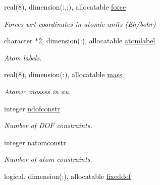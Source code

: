 \begin{DoxyCompactItemize}
real(8), dimension(\+:,\+:), allocatable \mbox{\hyperlink{structchemstr_1_1cxs_a05728bee6f7eb6e96b055e20ed6e6269}{force}}
\begin{DoxyCompactList}\small\item\em Forces wrt coordinates in atomic units (Eh/bohr) \end{DoxyCompactList}\item 
\mbox{\label{structchemstr_1_1cxs_a095011444234c28cf8331d986766af91}} 
character $\ast$2, dimension(\+:), allocatable \mbox{\hyperlink{structchemstr_1_1cxs_a095011444234c28cf8331d986766af91}{atomlabel}}
\begin{DoxyCompactList}\small\item\em Atom labels. \end{DoxyCompactList}\item 
\mbox{\label{structchemstr_1_1cxs_aa039bad319d194ec552f20d907b39127}} 
real(8), dimension(\+:), allocatable \mbox{\hyperlink{structchemstr_1_1cxs_aa039bad319d194ec552f20d907b39127}{mass}}
\begin{DoxyCompactList}\small\item\em Atomic masses in au. \end{DoxyCompactList}\item 
\mbox{\label{structchemstr_1_1cxs_a9f17c74f4ba3a0c7e92773b971c64852}} 
integer \mbox{\hyperlink{structchemstr_1_1cxs_a9f17c74f4ba3a0c7e92773b971c64852}{ndofconstr}}
\begin{DoxyCompactList}\small\item\em Number of D\+OF constraints. \end{DoxyCompactList}\item 
\mbox{\label{structchemstr_1_1cxs_a69b9cc3edf936c7544e131baa3a7f0f4}} 
integer \mbox{\hyperlink{structchemstr_1_1cxs_a69b9cc3edf936c7544e131baa3a7f0f4}{natomconstr}}
\begin{DoxyCompactList}\small\item\em Number of atom constraints. \end{DoxyCompactList}\item 
\mbox{\label{structchemstr_1_1cxs_abcda91614d230698c1e3c3707b2771a7}} 
logical, dimension(\+:), allocatable \mbox{\hyperlink{structchemstr_1_1cxs_abcda91614d230698c1e3c3707b2771a7}{fixeddof}}

\end{DoxyCompactItemize}
